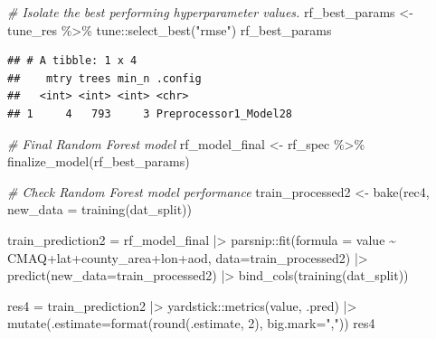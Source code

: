 \documentclass[
]{article}
\newenvironment{Shaded}{\begin{snugshade}}{\end{snugshade}}
\newcommand{\AttributeTok}[1]{\textcolor[rgb]{0.77,0.63,0.00}{#1}}
\newcommand{\CommentTok}[1]{\textcolor[rgb]{0.56,0.35,0.01}{\textit{#1}}}
\newcommand{\DecValTok}[1]{\textcolor[rgb]{0.00,0.00,0.81}{#1}}
\newcommand{\FunctionTok}[1]{\textcolor[rgb]{0.00,0.00,0.00}{#1}}
\newcommand{\NormalTok}[1]{#1}
\newcommand{\OtherTok}[1]{\textcolor[rgb]{0.56,0.35,0.01}{#1}}
\newcommand{\SpecialCharTok}[1]{\textcolor[rgb]{0.00,0.00,0.00}{#1}}
\newcommand{\StringTok}[1]{\textcolor[rgb]{0.31,0.60,0.02}{#1}}
\begin{document}
\begin{Shaded}
\begin{Highlighting}[]
\CommentTok{\# Isolate the best performing hyperparameter values.}
\NormalTok{rf\_best\_params }\OtherTok{\textless{}{-}}\NormalTok{ tune\_res }\SpecialCharTok{\%\textgreater{}\%}\NormalTok{ tune}\SpecialCharTok{::}\FunctionTok{select\_best}\NormalTok{(}\StringTok{"rmse"}\NormalTok{)}
\NormalTok{rf\_best\_params}
\end{Highlighting}
\end{Shaded}

\begin{verbatim}
## # A tibble: 1 x 4
##    mtry trees min_n .config              
##   <int> <int> <int> <chr>                
## 1     4   793     3 Preprocessor1_Model28
\end{verbatim}

\begin{Shaded}
\begin{Highlighting}[]
\CommentTok{\# Final Random Forest model}
\NormalTok{rf\_model\_final }\OtherTok{\textless{}{-}}\NormalTok{ rf\_spec }\SpecialCharTok{\%\textgreater{}\%} \FunctionTok{finalize\_model}\NormalTok{(rf\_best\_params)}

\CommentTok{\# Check Random Forest model performance}
\NormalTok{train\_processed2 }\OtherTok{\textless{}{-}} \FunctionTok{bake}\NormalTok{(rec4,  }\AttributeTok{new\_data =} \FunctionTok{training}\NormalTok{(dat\_split))}

\NormalTok{train\_prediction2 }\OtherTok{=}\NormalTok{ rf\_model\_final }\SpecialCharTok{|\textgreater{}} 
\NormalTok{  parsnip}\SpecialCharTok{::}\FunctionTok{fit}\NormalTok{(}\AttributeTok{formula =}\NormalTok{ value }\SpecialCharTok{\textasciitilde{}}\NormalTok{ CMAQ}\SpecialCharTok{+}\NormalTok{lat}\SpecialCharTok{+}\NormalTok{county\_area}\SpecialCharTok{+}\NormalTok{lon}\SpecialCharTok{+}\NormalTok{aod, }\AttributeTok{data=}\NormalTok{train\_processed2) }\SpecialCharTok{|\textgreater{}} 
  \FunctionTok{predict}\NormalTok{(}\AttributeTok{new\_data=}\NormalTok{train\_processed2) }\SpecialCharTok{|\textgreater{}} 
  \FunctionTok{bind\_cols}\NormalTok{(}\FunctionTok{training}\NormalTok{(dat\_split))}
  
\NormalTok{res4 }\OtherTok{=}\NormalTok{ train\_prediction2 }\SpecialCharTok{|\textgreater{}} 
\NormalTok{  yardstick}\SpecialCharTok{::}\FunctionTok{metrics}\NormalTok{(value, .pred) }\SpecialCharTok{|\textgreater{}} 
  \FunctionTok{mutate}\NormalTok{(}\AttributeTok{.estimate=}\FunctionTok{format}\NormalTok{(}\FunctionTok{round}\NormalTok{(.estimate, }\DecValTok{2}\NormalTok{), }\AttributeTok{big.mark=}\StringTok{","}\NormalTok{))}
\NormalTok{res4}
\end{Highlighting}
\end{Shaded}
\end{document}
